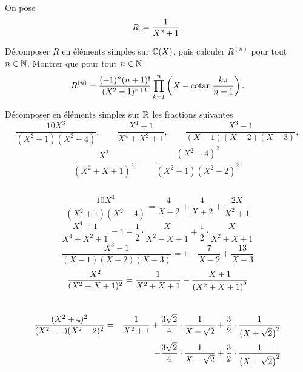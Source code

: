 \documentclass{magnolia}
\begin{document}
On pose
\[R\coloneqq\frac{1}{X^2+1}.\]
\begin{questions}
\question Décomposer $R$ en éléments simples sur $\fracC$,
  puis calculer $R^{(n)}$ pour tout $n\in\mathbb{N}$.
\question Montrer que pour tout $n\in\mathbb{N}$
  \[R^{(n)}=\frac{(-1)^n (n+1)!}{(X^2+1)^{n+1}}\prod_{k=1}^n \left(X-\operatorname{cotan}\frac{k\pi}{n+1}\right).\]
\end{questions}



Décomposer en éléments simples sur $\mathbb{R}$ les fractions suivantes
\[\frac{10X^3}{(X^2+1)(X^2-4)}, \qquad \frac{X^4+1}{X^4+X^2+1},
  \qquad \frac{X^3-1}{(X-1)(X-2)(X-3)},\]
\[\frac{X^2}{(X^2+X+1)^2}, \qquad \frac{(X^2+4)^2}{(X^2+1)(X^2-2)^2}.\]
\begin{sol}
$\quad$
\begin{questions}
\question 
  \[\frac{10X^3}{(X^2+1)(X^2-4)}=
    \frac{4}{X-2}+\frac{4}{X+2}+\frac{2X}{X^2+1}\]
\question 
  \[\frac{X^4+1}{X^4+X^2+1}=
    1-\frac{1}{2}\cdot\frac{X}{X^2-X+1}+\frac{1}{2}\cdot\frac{X}{X^2+X+1}\]
\question 
  \[\frac{X^3-1}{(X-1)(X-2)(X-3)}=
    1-\frac{7}{X-2}+\frac{13}{X-3}\]
\question 
  \[\frac{X^2}{(X^2+X+1)^2}=
    \frac{1}{X^2+X+1}-\frac{X+1}{\left(X^2+X+1\right)^2}\]\
\question 
  \begin{eqnarray*}
  \frac{(X^2+4)^2}{(X^2+1)(X^2-2)^2}&=&
    \frac{1}{X^2+1}+\frac{3\sqrt{2}}{4}\cdot\frac{1}{X+\sqrt{2}}
    +\frac{3}{2}\cdot\frac{1}{\left(X+\sqrt{2}\right)^2}\\
   & &
    -\frac{3\sqrt{2}}{4}\cdot\frac{1}{X-\sqrt{2}}
    +\frac{3}{2}\cdot\frac{1}{\left(X-\sqrt{2}\right)^2}
  \end{eqnarray*}
\end{questions}
\end{sol}






\end{document}

